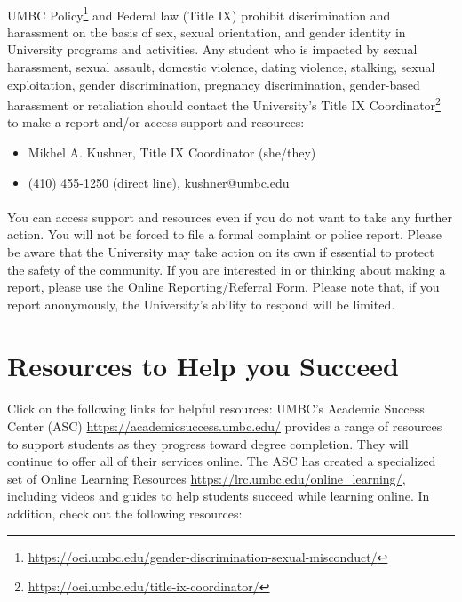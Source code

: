 \documentclass[letter,11pt]{article}
\begin{document}
\paragraph{}UMBC Policy\footnote{\url{https://oei.umbc.edu/gender-discrimination-sexual-misconduct/}} and Federal law (Title IX) prohibit discrimination and harassment on the basis of sex, sexual orientation, and gender identity in University programs and activities. Any student who is impacted by sexual harassment, sexual assault, domestic violence, dating violence, stalking, sexual exploitation, gender discrimination, pregnancy discrimination, gender-based harassment or retaliation should contact the University’s Title IX Coordinator\footnote{\url{https://oei.umbc.edu/title-ix-coordinator/}} to make a report and/or access support and resources:
\begin{itemize}
\item Mikhel A. Kushner, Title IX Coordinator (she/they)
\item \href{tel:+14104551250}{(410) 455-1250} (direct line), \href{mailto:kushner@umbc.edu?Subject=Title\%20IX}{kushner@umbc.edu}
\end{itemize}

\paragraph{}You can access support and resources even if you do not want to take any further action. You will not be forced to file a formal complaint or police report. Please be aware that the University may take action on its own if essential to protect the safety of the community. If you are interested in or thinking about making a report, please use the Online Reporting/Referral Form. Please note that, if you report anonymously,  the University’s ability to respond will be limited.

\section*{Resources to Help you Succeed}
\paragraph{}Click on the following links for helpful resources:
UMBC’s Academic Success Center (ASC) \url{https://academicsuccess.umbc.edu/} provides a range of resources to support students as they progress toward degree completion. They will continue to offer all of their services online. 
The ASC has created a specialized set of Online Learning Resources \url{https://lrc.umbc.edu/online_learning/}, including videos and guides to help students succeed while learning online.
In addition, check out the following resources:
\end{document}
